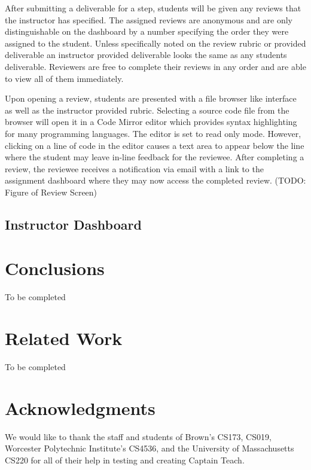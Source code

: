 \documentclass{sig-alternate}
\begin{document}
After submitting a deliverable for a step, students will be given any
reviews that the instructor has specified. The assigned reviews are anonymous
and are only distinguishable on the dashboard by a number specifying the order
they were assigned to the student. Unless specifically noted on the review
rubric or provided deliverable an instructor provided deliverable looks the
same as any students deliverable. Reviewers are free to complete their reviews
in any order and are able to view all of them immediately.

Upon opening a review, students are presented with a file browser like
interface as well as the instructor provided rubric. Selecting a source code
file from the browser will open it in a Code Mirror editor which provides
syntax highlighting for many programming languages. The editor is set to read
only mode. However, clicking on a line of code in the editor causes a text
area to appear below the line where the student may leave in-line feedback for
the reviewee. After completing a review, the reviewee receives a notification 
via email with a link to the assignment dashboard where they may now access 
the completed review. (TODO: Figure of Review Screen)



\subsection{Instructor Dashboard}

\section{Conclusions}
To be completed


\section{Related Work}
To be completed


\section{Acknowledgments}
We would like to thank the staff and students of Brown's CS173, CS019, 
Worcester Polytechnic Institute's CS4536, and the University of Massachusetts
CS220 for all of their help in testing and creating Captain Teach.



%

%
%
\end{document}
